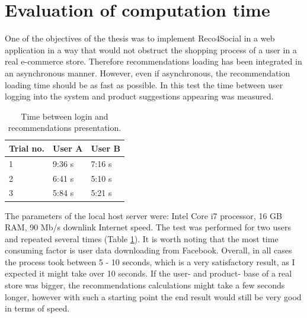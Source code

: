 \documentclass[12pt]{report}
\begin{document}


\section{Evaluation of computation time}

One of the objectives of the thesis was to implement Reco4Social in a web application in a way that would not obstruct the shopping process of a user in a real e-commerce store. Therefore recommendations loading has been integrated in an asynchronous manner. However, even if asynchronous, the recommendation loading time should be as fast as possible. In this test the time between user logging into the system and product suggestions appearing was measured.

\begin{table}[hptb]
\centering
\caption{Time between login and recommendations presentation.}
\label{table.eval.time1}
\vspace{3mm}
\begin{tabular}{|l|l|l|}
\hline
Trial no. & User A & User B \\ \hline
1         & 9:36 s & 7:16 s \\ \hline
2         & 6:41 s & 5:10 s \\ \hline
3         & 5:84 s & 5:21 s \\ \hline
\end{tabular}
\end{table}

The parameters of the local host server were: Intel Core i7 processor, 16 GB RAM, 90 Mb/s downlink Internet speed. The test was performed for two users and repeated several times (Table \ref{table.eval.time1}). It is worth noting that the most time consuming factor is user data downloading from Facebook. Overall, in all cases the process took between 5 - 10 seconds, which is a very satisfactory result, as I expected it might take over 10 seconds. If the user- and product- base of a real store was bigger, the recommendations calculations might take a few seconds longer, however with such a starting point the end result would still be very good in terms of speed.
\end{document}
